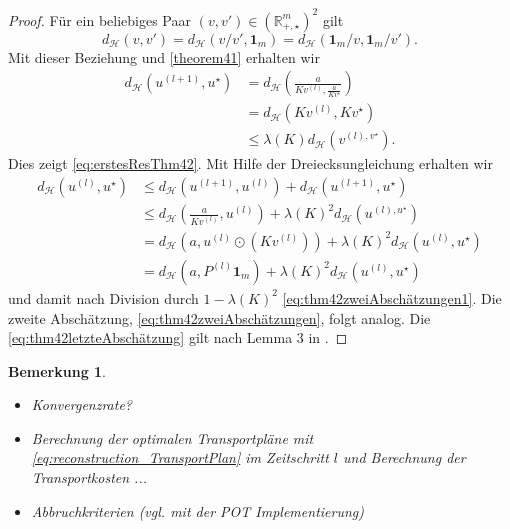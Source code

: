 \documentclass[11pt,a4paper]{article}
\newtheorem{remark}[theorem]{Bemerkung}
\numberwithin{equation}{section}
\begin{document}
	\begin{proof}
		Für ein beliebiges Paar $(v,v') \in (\mathbb{R}_{+,\star}^m)^2$ gilt
		\begin{equation*}
			d_\mathcal{H} (v,v') = d_\mathcal{H}(v/v',\boldsymbol{1}_m) = d_\mathcal{H}(\boldsymbol{1}_m/v,\boldsymbol{1}_m/v').
		\end{equation*}
		Mit dieser Beziehung und \autoref{theorem41} erhalten wir
		\begin{align*}
		d_\mathcal{H}(u^{(l+1)}, u^\star) &= d_\mathcal{H}\left(\frac{a}{Kv^{(l)},\frac{a}{Kv^\star}}\right)\\
		&=d_\mathcal{H}(Kv^{(l)}, Kv^\star) \\
		&\leq \lambda (K)d_\mathcal{H}(v^{(l),v^\star}).
		\end{align*}
		Dies zeigt \autoref{eq:erstesResThm42}. Mit Hilfe der Dreiecksungleichung erhalten wir
		\begin{align*}
			d_\mathcal{H}(u^{(l)}, u^\star) &\leq d_\mathcal{H}(u^{(l+1)},u^{(l)}) + d_\mathcal{H}(u^{(l+1)},u^\star)\\
			& \leq d_\mathcal{H}\left(\frac{a}{Kv^{(l)}}, u^{(l)}\right) + \lambda (K)^2 d_\mathcal{H}(u^{(l),u^\star})\\
			&= d_\mathcal{H}\left(a, u^{(l)} \odot (Kv^{(l)})\right) + \lambda (K)^2 d_\mathcal{H}(u^{(l)},u^\star)\\
			&= d_\mathcal{H}\left(a, P^{(l)}\boldsymbol{1}_m \right) + \lambda (K)^2 d_\mathcal{H}(u^{(l)},u^\star)
		\end{align*}
		und damit nach Division durch $1-\lambda(K)^2$  \autoref{eq:thm42zweiAbschätzungen1}. Die zweite Abschätzung, \autoref{eq:thm42zweiAbschätzungen}, folgt analog. 
		Die \autoref{eq:thm42letzteAbschätzung} gilt nach Lemma 3 in \cite{franklin_sinkhorn_convergence}.
	\end{proof}

	\begin{remark}
		\leavevmode 
		\begin{itemize}
			\item Konvergenzrate?
			\item Berechnung der optimalen Transportpläne mit \autoref{eq:reconstruction_TransportPlan} im Zeitschritt $l$ und Berechnung der Transportkosten ...
			\item Abbruchkriterien (vgl. mit der POT Implementierung)
		\end{itemize}
	\end{remark}
\end{document}
